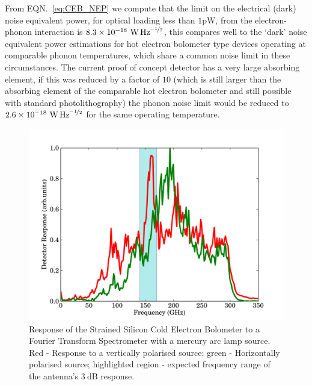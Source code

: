 \documentclass[aip, apl, a4paper, amsmath,amssymb, reprint]{revtex4-1}
\begin{document}
From EQN.~\ref{eq:CEB_NEP} we compute that the limit on the electrical (dark) noise equivalent power, for optical loading less than $1\mathrm{pW}$, from the electron-phonon interaction is $8.3 \times 10^{-18}~\mathrm{\mbox{W\,Hz}^{\nicefrac{-1}{2}}}$, this compares well to the `dark' noise equivalent power estimations for hot electron bolometer type devices operating at comparable phonon temperatures\cite{Karasik2011}, which share a common noise limit in these circumstances. The current proof of concept detector has a very large absorbing element, if this was reduced by a factor of $10$ (which is still larger than the absorbing element of the comparable hot electron bolometer\cite{Karasik2011} and still possible with standard photolithography) the phonon noise limit would be reduced to $2.6\times 10^{-18}~\mathrm{\mbox{W\,Hz}^{\nicefrac{-1}{2}}}$ for the same operating temperature.
\begin{figure}[ht]
\includegraphics[width = 0.8\columnwidth]{01_FTS_response}
\caption{Response of the Strained Silicon Cold Electron Bolometer to a Fourier Transform Spectrometer with a mercury arc lamp source. Red - Response to a vertically polarised source; green - Horizontally polarised source; highlighted region - expected frequency range of the antenna's $3~\mathrm{dB}$ response.}
\label{fig:FTS_response}
\end{figure}
\end{document}
